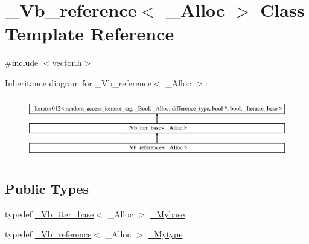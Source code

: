 \hypertarget{class___vb__reference}{\section{\+\_\+\+Vb\+\_\+reference$<$ \+\_\+\+Alloc $>$ Class Template Reference}
\label{class___vb__reference}
}


{\ttfamily \#include $<$vector.\+h$>$}

Inheritance diagram for \+\_\+\+Vb\+\_\+reference$<$ \+\_\+\+Alloc $>$\+:\begin{figure}[H]
\begin{center}
\leavevmode
\includegraphics[height=2.705314cm]{class___vb__reference}
\end{center}
\end{figure}
\subsection*{Public Types}
\begin{DoxyCompactItemize}
\item 
typedef \hyperlink{class___vb__iter__base}{\+\_\+\+Vb\+\_\+iter\+\_\+base}$<$ \+\_\+\+Alloc $>$ \hyperlink{class___vb__reference_a9885641a0d5bfa12196f9b2fa497fd0d}{\+\_\+\+Mybase}
\item 
typedef \hyperlink{class___vb__reference}{\+\_\+\+Vb\+\_\+reference}$<$ \+\_\+\+Alloc $>$ \hyperlink{class___vb__reference_aa1f6faf9ee4e99f42b9ba34d0ca98705}{\+\_\+\+Mytype}
\end{DoxyCompactItemize}
